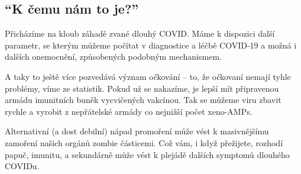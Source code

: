 \documentclass[main.tex]{subfiles}
\begin{document}
\subsection*{\enquote{K čemu nám to je?}}
Přicházíme na kloub záhadě zvané dlouhý COVID. Máme k dispozici další parametr, se kterým můžeme počítat v diagnostice a léčbě COVID-19 a možná i dalších onemocnění, způsobených podobným mechanismem.\par
A taky to ještě více pozvedává význam očkování – to, že očkovaní nemají tyhle problémy, víme ze statistik. Pokud už se nakazíme, je lepší mít připravenou armádu imunitních buněk vycvičených vakcínou. Tak se můžeme viru zbavit rychle a vyrobit z nepřátelské armády co nejnižší počet xeno-AMPs.\par
Alternativní (a dost debilní) nápad promoření může vést k masivnějšímu zamoření našich orgánů zombie částicemi. Což vám, i když přežijete, rozhodí papuč, imunitu, a sekundárně může vést k plejádě dalších symptomů dlouhého COVIDu.
\newpage
\end{document}
